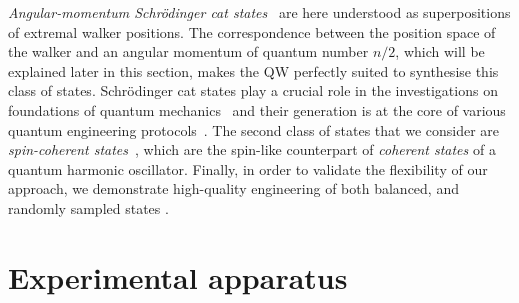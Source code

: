 \emph{Angular-momentum Schrödinger cat states}~\cite{militello2006distilling} are here understood as superpositions of extremal walker positions. The correspondence between the position space of the walker and an angular momentum of quantum number $n/2$, which will be explained later in this section, makes the \ac{QW} perfectly suited to synthesise this class of states. Schrödinger cat states play a crucial role in the investigations on foundations of quantum mechanics~\cite{schrodinger1935gegenwartige} and their generation is at the core of various quantum engineering protocols~\cite{brune1992manipulation, monroe1996schrodinger,agarwal1997atomic, zhang2016creating}. The second class of states that we consider are \emph{spin-coherent states}~\cite{ulyanov1999spin}, which are the spin-like counterpart of \emph{coherent states} of a quantum harmonic oscillator. Finally, in order to validate the flexibility of our approach, we demonstrate high-quality engineering of both balanced, and randomly sampled states .

\section{Experimental apparatus}
\label{sec:expQWs:experimental_apparatus}

